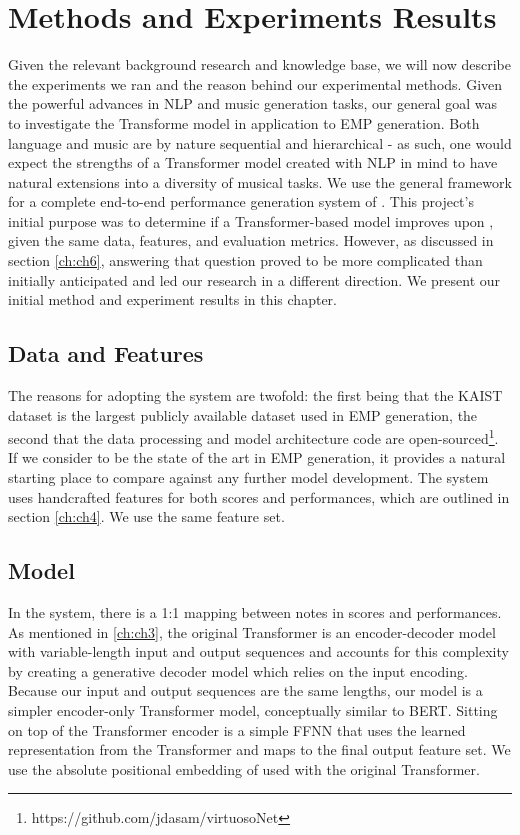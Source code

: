\chapter{Methods and Experiments Results}\label{ch:ch5}
Given the relevant background research and knowledge base, we will now describe the experiments we ran and the reason behind our experimental methods. Given the powerful advances in NLP and music generation tasks, our general goal was to investigate the Transforme model in application to EMP generation. Both language and music are by nature sequential and hierarchical - as such, one would expect the strengths of a Transformer model created with NLP in mind to have natural extensions into a diversity of musical tasks. We use the general framework for a complete end-to-end performance generation system of \vnet{}. This project's initial purpose was to determine if a Transformer-based model improves upon \vnet{}, given the same data, features, and evaluation metrics. However, as discussed in section \ref{ch:ch6}, answering that question proved to be more complicated than initially anticipated and led our research in a different direction. We present our initial method and experiment results in this chapter. 

\section{Data and Features}
The reasons for adopting the \vnet{} system are twofold: the first being that the KAIST dataset is the largest publicly available dataset used in EMP generation, the second that the data processing and model architecture code \vnet{} are open-sourced\footnote{https://github.com/jdasam/virtuosoNet}. If we consider \vnet{} to be the state of the art in EMP generation, it provides a natural starting place to compare against any further model development. The \vnet{} system uses handcrafted features for both scores and performances, which are outlined in section \ref{ch:ch4}. We use the same feature set.

\section{Model}
In the \vnet{} system, there is a 1:1 mapping between notes in scores and performances. As mentioned in \ref{ch:ch3}, the original Transformer is an encoder-decoder \seq{} model with variable-length input and output sequences and accounts for this complexity by creating a generative decoder model which relies on the input encoding. Because our input and output sequences are the same lengths, our model is a simpler encoder-only Transformer model, conceptually similar to BERT. Sitting on top of the Transformer encoder is a simple FFNN that uses the learned representation from the Transformer and maps to the final output feature set. We use the absolute positional embedding of \citet{vaswani2017attention} used with the original Transformer. 


